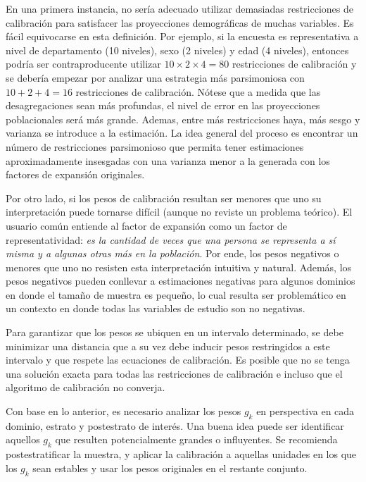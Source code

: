 \documentclass[
  12pt,
]{book}
\begin{document}
En una primera instancia, no sería adecuado utilizar demasiadas restricciones de calibración para satisfacer las proyecciones demográficas de muchas variables. Es fácil equivocarse en esta definición. Por ejemplo, si la encuesta es representativa a nivel de departamento (10 niveles), sexo (2 niveles) y edad (4 niveles), entonces podría ser contraproducente utilizar \(10 \times 2 \times 4 = 80\) restricciones de calibración y se debería empezar por analizar una estrategia más parsimoniosa con \(10 + 2 + 4 = 16\) restricciones de calibración. Nótese que a medida que las desagregaciones sean más profundas, el nivel de error en las proyecciones poblacionales será más grande. Ademas, entre más restricciones haya, más sesgo y varianza se introduce a la estimación. La idea general del proceso es encontrar un número de restricciones parsimonioso que permita tener estimaciones aproximadamente insesgadas con una varianza menor a la generada con los factores de expansión originales.

Por otro lado, si los pesos de calibración resultan ser menores que uno su interpretación puede tornarse difícil (aunque no reviste un problema teórico). El usuario común entiende al factor de expansión como un factor de representatividad: \emph{es la cantidad de veces que una persona se representa a sí misma y a algunas otras más en la población}. Por ende, los pesos negativos o menores que uno no resisten esta interpretación intuitiva y natural. Además, los pesos negativos pueden conllevar a estimaciones negativas para algunos dominios en donde el tamaño de muestra es pequeño, lo cual resulta ser problemático en un contexto en donde todas las variables de estudio son no negativas.

Para garantizar que los pesos se ubiquen en un intervalo determinado, se debe minimizar una distancia que a su vez debe inducir pesos restringidos a este intervalo y que respete las ecuaciones de calibración. Es posible que no se tenga una solución exacta para todas las restricciones de calibración e incluso que el algoritmo de calibración no converja.

Con base en lo anterior, es necesario analizar los pesos \(g_k\) en perspectiva en cada dominio, estrato y postestrato de interés. Una buena idea puede ser identificar aquellos \(g_k\) que resulten potencialmente grandes o influyentes. Se recomienda postestratificar la muestra, y aplicar la calibración a aquellas unidades en los que los \(g_k\) sean estables y usar los pesos originales en el restante conjunto.
\end{document}
